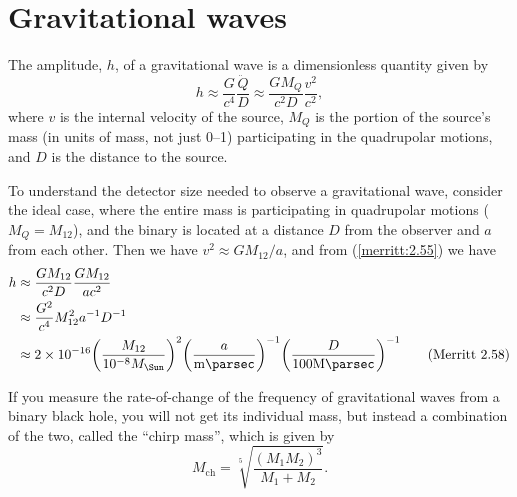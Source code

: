 \documentclass[degn-notes.tex]{subfiles}
\begin{document}
\section{Gravitational waves}

The amplitude, $h$, of a gravitational wave is a dimensionless quantity given by
%
\begin{displaymath}
  h \approx
  \frac{G}{c^4} \frac{\ddot{Q}}{D} \approx
  \frac{G M_Q}{c^2 D} \frac{v^2}{c^2},
%
  \tag{Merritt 2.55}
  \label{merritt:2.55}
\end{displaymath}
%
where $v$ is the internal velocity of the source, $M_Q$ is the portion of the source's mass (in units of mass, not just 0--1) participating in the quadrupolar motions, and $D$ is the distance to the source.

To understand the detector size needed to observe a gravitational wave, consider the ideal case, where the entire mass is participating in quadrupolar motions ($M_Q = M_{12}$), and the binary is located at a distance $D$ from the observer and $a$ from each other. Then we have $v^2 \approx G M_{12} / a$, and from (\ref{merritt:2.55}) we have
%
\begin{align*}
  h &\approx
  \frac{G M_{12}}{c^2 D} \frac{G M_{12}}{a c^2}
  \\ &\approx
  \frac{G^2}{c^4} M_{12}^2 a^{-1} D^{-1}
  \\ &\approx
  \num{2e-16}
  \qty(\frac{M_{12}}{10^{-8} M_{\Sun}})^2
  \qty(\frac{a}{\si{\milli\parsec}})^{-1}
  \qty(\frac{D}{100\si{\mega\parsec}})^{-1}
%
  \tag{Merritt 2.58}
  \label{merritt:2.58}
\end{align*}

If you measure the rate-of-change of the frequency of gravitational waves from a binary black hole, you will not get its individual mass, but instead a combination of the two, called the ``chirp mass'', which is given by
%
\begin{equation}
  M_{\mathrm{ch}} =
  \sqrt[5]{\frac{(M_1 M_2)^3}{M_1 + M_2}}.
%
  \label{eqn:chirp-mass}
\end{equation}
\end{document}
